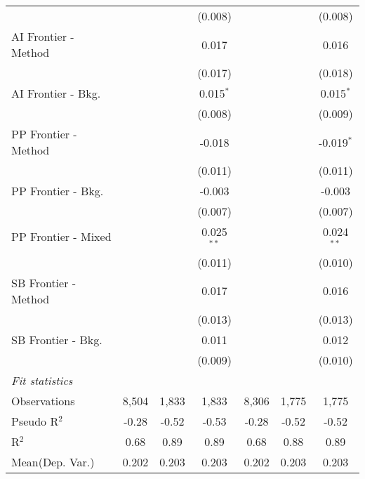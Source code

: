 \begin{tabular}{lcccccc}
                        &               &              & (0.008)      &               &              & (0.008)\\   
   AI Frontier - Method &               &              & 0.017        &               &              & 0.016\\   
                        &               &              & (0.017)      &               &              & (0.018)\\   
   AI Frontier - Bkg.   &               &              & 0.015$^{*}$  &               &              & 0.015$^{*}$\\   
                        &               &              & (0.008)      &               &              & (0.009)\\   
   PP Frontier - Method &               &              & -0.018       &               &              & -0.019$^{*}$\\   
                        &               &              & (0.011)      &               &              & (0.011)\\   
   PP Frontier - Bkg.   &               &              & -0.003       &               &              & -0.003\\   
                        &               &              & (0.007)      &               &              & (0.007)\\   
   PP Frontier - Mixed  &               &              & 0.025$^{**}$ &               &              & 0.024$^{**}$\\   
                        &               &              & (0.011)      &               &              & (0.010)\\   
   SB Frontier - Method &               &              & 0.017        &               &              & 0.016\\   
                        &               &              & (0.013)      &               &              & (0.013)\\   
   SB Frontier - Bkg.   &               &              & 0.011        &               &              & 0.012\\   
                        &               &              & (0.009)      &               &              & (0.010)\\   
   \midrule
   \emph{Fit statistics}\\
   Observations         & 8,504         & 1,833        & 1,833        & 8,306         & 1,775        & 1,775\\  
   Pseudo R$^2$         & -0.28         & -0.52        & -0.53        & -0.28         & -0.52        & -0.52\\  
   R$^2$                & 0.68          & 0.89         & 0.89         & 0.68          & 0.88         & 0.89\\  
Mean(Dep. Var.) & 0.202 & 0.203 & 0.203 & 0.202 & 0.203 & 0.203 \\
   

\end{tabular}
